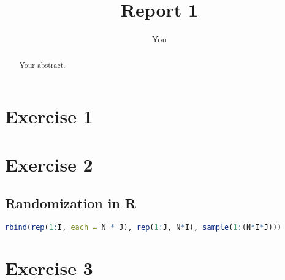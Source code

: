 \documentclass{article}
\title{Report 1}
\author{You}
\begin{document}
\maketitle

\begin{abstract}
Your abstract.
\end{abstract}

\section{Exercise 1}

\section{Exercise 2}

\subsection{Randomization in R}
\begin{lstlisting}[language=R]
rbind(rep(1:I, each = N * J), rep(1:J, N*I), sample(1:(N*I*J)))
\end{lstlisting}





\section{Exercise 3}




\end{document}
